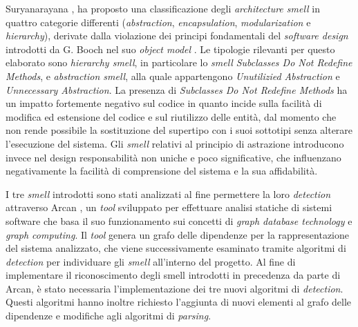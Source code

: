    Suryanarayana \cite{SURYANARAYANA201521}, ha proposto una classificazione degli \textit{architecture smell} in quattro categorie differenti (\textit{abstraction}, \textit{encapsulation}, \textit{modularization} e \textit{hierarchy}), derivate dalla violazione dei principi fondamentali del \textit{software design} introdotti da G. Booch nel suo \textit{object model} \cite{booch2008object}.
    Le tipologie rilevanti per questo elaborato sono \textit{hierarchy smell}, in particolare lo \textit{smell} \textit{Subclasses Do Not Redefine Methods}, e \textit{abstraction smell}, alla quale appartengono \textit{Unutilizied Abstraction} e \textit{Unnecessary Abstraction}. La presenza di \textit{Subclasses Do Not Redefine Methods} ha un impatto fortemente negativo sul codice in quanto incide sulla facilità di modifica ed estensione del codice e sul riutilizzo delle entità, dal momento che non rende possibile la sostituzione del supertipo con i suoi sottotipi senza alterare l'esecuzione del sistema. 
    Gli \textit{smell} relativi al principio di astrazione introducono invece nel design responsabilità non uniche e poco significative, che influenzano negativamente la facilità di comprensione del sistema e la sua affidabilità.
        
    I tre \textit{smell} introdotti sono stati analizzati al fine permettere la loro \textit{detection} attraverso Arcan \cite{Arcan2017} \cite{ESSeREwebsite}, un \textit{tool} sviluppato per effettuare analisi statiche di sistemi software che basa il suo funzionamento sui concetti di \textit{graph database technology} e \textit{graph computing}. 
    Il \textit{tool} genera un grafo delle dipendenze per la rappresentazione del sistema analizzato, che viene successivamente esaminato tramite algoritmi di \textit{detection} per individuare gli \textit{smell} all'interno del progetto. 
    Al fine di implementare il riconoscimento degli smell introdotti in precedenza da parte di Arcan, è stato necessaria l'implementazione dei tre nuovi algoritmi di \textit{detection}. Questi algoritmi hanno inoltre richiesto l'aggiunta di nuovi elementi al grafo delle dipendenze e modifiche agli algoritmi di \textit{parsing}.
    
